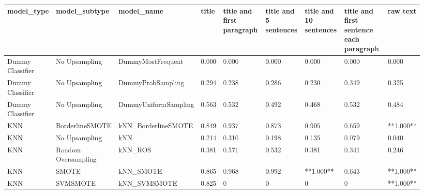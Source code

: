 \begin{tabular}{lllllllll}
\toprule
                  model\_type &       model\_subtype &                                   model\_name & title & title and first paragraph & title and 5 sentences & title and 10 sentences & title and first sentence each paragraph &  raw text \\
\midrule
            Dummy Classifier &       No Upsampling &                            DummyMostFrequent & 0.000 &                     0.000 &                 0.000 &                  0.000 &                                   0.000 &     0.000 \\
            Dummy Classifier &       No Upsampling &                            DummyProbSampling & 0.294 &                     0.238 &                 0.286 &                  0.230 &                                   0.349 &     0.325 \\
            Dummy Classifier &       No Upsampling &                         DummyUniformSampling & 0.563 &                     0.532 &                 0.492 &                  0.468 &                                   0.532 &     0.484 \\
                         KNN &     BorderlineSMOTE &                          kNN\_BorderlineSMOTE & 0.849 &                     0.937 &                 0.873 &                  0.905 &                                   0.659 & **1.000** \\
                         KNN &       No Upsampling &                                          kNN & 0.214 &                     0.310 &                 0.198 &                  0.135 &                                   0.079 &     0.040 \\
                         KNN & Random Oversampling &                                      kNN\_ROS & 0.381 &                     0.571 &                 0.532 &                  0.381 &                                   0.341 &     0.246 \\
                         KNN &               SMOTE &                                    kNN\_SMOTE & 0.865 &                     0.968 &                 0.992 &              **1.000** &                                   0.643 & **1.000** \\
                         KNN &            SVMSMOTE &                                 kNN\_SVMSMOTE & 0.825 &                         0 &                     0 &                      0 &                                       0 & **1.000** \\

\end{tabular}
